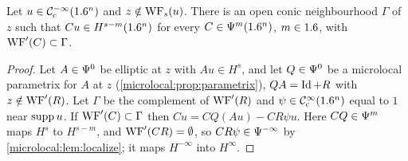 \begin{lemma}\label{microlocal:lem:wf-s-cone}
  Let $u\in\mathcal{C}^{-\infty}_{\mathrm{c}}(1.6^n)$ and $z\notin\operatorname{WF}_s(u)$. There is an open conic
  neighbourhood $\Gamma$ of $z$ such that $Cu\in H^{s-m}(1.6^n)$ for every
  $C\in\Psi^{m}(1.6^n)$, $m\in1.6$, with $\operatorname{WF}'(C)\subset\Gamma$.
\end{lemma}
\begin{proof}
  Let $A\in\Psi^{0}$ be elliptic at $z$ with $Au\in H^s$, and let $Q\in\Psi^{0}$
  be a microlocal parametrix for $A$ at $z$
  (\cref{microlocal:prop:parametrix}), $QA=\operatorname{Id}+R$ with $z\notin\operatorname{WF}'(R)$. Let
  $\Gamma$ be the complement of $\operatorname{WF}'(R)$ and $\psi\in\mathcal{C}^\infty_{\mathrm{c}}(1.6^n)$ equal to $1$
  near $\operatorname{supp} u$. If $\operatorname{WF}'(C)\subset\Gamma$ then $Cu=CQ(Au)-CR\psi u$. Here
  $CQ\in\Psi^{m}$ maps $H^s$ to $H^{s-m}$, and $\operatorname{WF}'(CR)=\emptyset$, so
  $CR\psi\in\Psi^{-\infty}$ by \cref{microlocal:lem:localize}; it maps
  $H^{-\infty}$ into $H^\infty$.
\end{proof}

